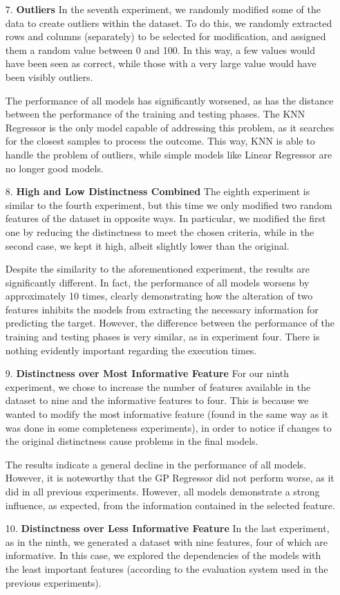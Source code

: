 \documentclass{Configuration_Files/PoliMi3i_thesis}
\begin{document}
\begin{enumerate}
\item[7.] \textbf{Outliers}
In the seventh experiment, we randomly modified some of the data to create outliers within the dataset.  To do this, we randomly extracted rows and columns (separately) to be selected for modification, and assigned them a random value between 0 and 100. In this way, a few values would have been seen as correct, while those with a very large value would have been visibly outliers.

The performance of all models has significantly worsened, as has the distance between the performance of the training and testing phases. The KNN Regressor is the only model capable of addressing this problem, as it searches for the closest samples to process the outcome. This way, KNN is able to handle the problem of outliers, while simple models like Linear Regressor are no longer good models.

\item[8.] \textbf{High and Low Distinctness Combined}
The eighth experiment is similar to the fourth experiment, but this time we only modified two random features of the dataset in opposite ways. In particular, we modified the first one by reducing the distinctness to meet the chosen criteria, while in the second case, we kept it high, albeit slightly lower than the original.

Despite the similarity to the aforementioned experiment, the results are significantly different. In fact, the performance of all models worsens by approximately 10 times, clearly demonstrating how the alteration of two features inhibits the models from extracting the necessary information for predicting the target. However, the difference between the performance of the training and testing phases is very similar, as in experiment four. There is nothing evidently important regarding the execution times.

\item[9.] \textbf{Distinctness over Most Informative Feature}
For our ninth experiment, we chose to increase the number of features available in the dataset to nine and the informative features to four. This is because we wanted to modify the most informative feature (found in the same way as it was done in some completeness experiments), in order to notice if changes to the original distinctness cause problems in the final models.

The results indicate a general decline in the performance of all models. However, it is noteworthy that the GP Regressor did not perform worse, as it did in all previous experiments. However, all models demonstrate a strong influence, as expected, from the information contained in the selected feature.
\item[10.] \textbf{Distinctness over Less Informative Feature}
In the last experiment, as in the ninth, we generated a dataset with nine features, four of which are informative. In this case, we explored the dependencies of the models with the least important features (according to the evaluation system used in the previous experiments).


\end{enumerate}
\end{document}
